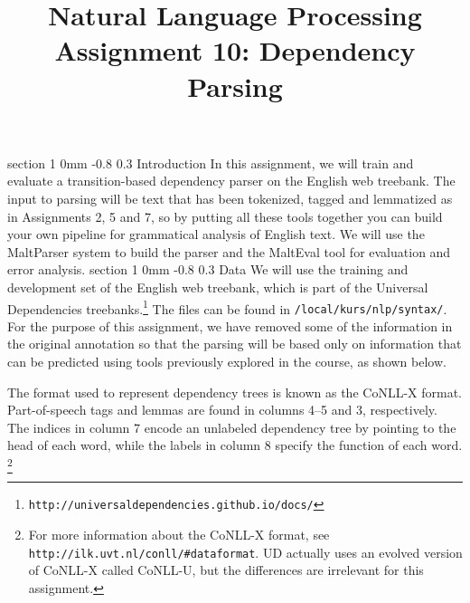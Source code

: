 \documentclass[11pt]{article}
\title{{\LARGE Natural Language Processing}\\[1.5mm]{\large Assignment 10: Dependency Parsing}}
\author{}
\date{} %
\makeatletter
\newcommand{\newsec}[2]{\section{#1}\label{sec:#2}\noindent}
\renewcommand{\section}{\@startsection
{section}%
{1}%
{0mm}%
{-0.8\baselineskip}%
{0.3\baselineskip}%
{\bfseries\large}}%
\makeatother
\begin{document}
 

\maketitle
\vspace{-2mm}
\newsec{Introduction}{intro}%
In this assignment, we will train and evaluate a transition-based dependency parser on the English web treebank. The input to parsing will be text that has been tokenized, tagged and lemmatized as in Assignments 2, 5 and 7, so by putting all these tools together you can build your own pipeline for grammatical analysis of English text. We will use the MaltParser system to build the parser and the MaltEval tool for evaluation and error analysis. 
\newsec{Data}{data}%
We will use the training and development set of the English web treebank, which is part of the Universal Dependencies treebanks.\footnote{{\tt http://universaldependencies.github.io/docs/}} The files can
be found in {\tt /local/kurs/nlp/syntax/}.
For the purpose of this assignment, we have removed some of the information in the original annotation 
so that the parsing will be based only on information that can be predicted using tools previously explored 
in the course, as shown below.
\begin{center}
\fbox{

}
\end{center}
The format used to represent dependency trees is known as the CoNLL-X format. Part-of-speech tags and lemmas are found in columns 4--5 and 3, respectively. The indices in column 7 encode an unlabeled dependency
tree by pointing to the head of each word, while the labels in column 8 specify the function of each word.%
\footnote{For more information about the CoNLL-X format, see 
{\tt http://ilk.uvt.nl/conll/\#dataformat}. UD actually 
uses an evolved version of CoNLL-X called CoNLL-U, but the differences are irrelevant for this assignment.}
\end{document}
